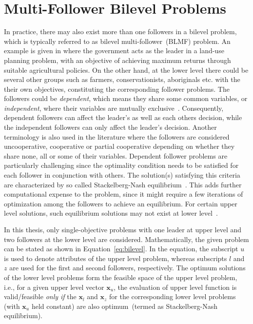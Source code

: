 \section{Multi-Follower Bilevel Problems}

In practice, there may also exist more than one followers in a bilevel problem, which is typically referred to
as bilevel multi-follower~(BLMF) problem. An example is given in \cite{lu2006bilevel} where the
government acts as the leader in a land-use planning problem, with an objective of achieving maximum
returns through suitable agricultural policies. On the other hand, at the lower level there could be
several other groups such as farmers, conservationists, aboriginals etc. with the their own
objectives, constituting the corresponding follower problems. The followers could be
\emph{dependent}, which means they share some common variables, or \emph{independent}, where their
variables are mutually exclusive~\cite{calvete2007linear,shi2005k}. Consequently, dependent
followers can affect the leader's as well as each others decision, while the independent followers
can only affect the leader's decision. Another terminology is also used in the literature
\cite{lu2006bilevel} where the followers are considered uncooperative, cooperative or partial
cooperative depending on whether they share none, all or some of their variables. Dependent follower
problems are particularly challenging since the optimality condition needs to be satisfied for each
follower in conjunction with others. The solution(s) satisfying this criteria are characterized by
so called Stackelberg-Nash equilibrium~\cite{liu1998stackelberg,angelo2015}. This adds further
computational expense to the problem, since it might require a few iterations of optimization among
the followers to achieve an equilibrium. For certain upper level solutions, such equilibrium
solutions may not exist at lower level~\cite{liu1998stackelberg}. 

In this thesis, only single-objective problems with one leader at upper level and two followers at the lower level are considered. Mathematically, the given problem can be stated as shown in Equation~\ref{eq:bilevel}. In the equation, the subscript $u$ is used to denote attributes of the upper level problem, whereas subscripts $l$ and $z$ are used for the first and second followers, respectively. The optimum solutions of the lower level problems form the feasible space of the upper level problem, i.e., for a given upper level vector $\mathbf{x}_u$, the evaluation of upper level function is valid/feasible \textit{only if} the $\mathbf{x}_l$ and $\mathbf{x}_z$  for the corresponding lower level problems (with $\mathbf{x}_u$ held constant) are also optimum~(termed as Stackelberg-Nash equilibrium). 


